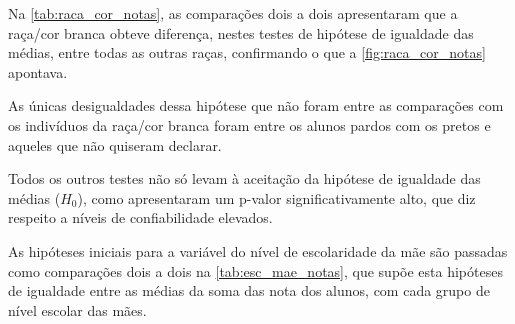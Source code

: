 Na \autoref{tab:raca_cor_notas}, as comparações dois a dois apresentaram que a raça/cor branca obteve diferença,
nestes testes de hipótese de igualdade das médias, entre todas as outras raças, confirmando o que a 
\autoref{fig:raca_cor_notas} apontava.

As únicas desigualdades dessa hipótese que não foram entre as comparações com os indivíduos da raça/cor branca
foram entre os alunos pardos com os pretos e aqueles que não quiseram declarar.

Todos os outros testes não só levam à aceitação da hipótese de igualdade das médias ($H_0$), como apresentaram um p-valor
significativamente alto, que diz respeito a níveis de confiabilidade elevados.


As hipóteses iniciais para a variável do nível de escolaridade da mãe são passadas como comparações dois a dois na \autoref{tab:esc_mae_notas},
que supõe esta hipóteses de igualdade entre as médias da soma das nota dos alunos, com cada grupo de nível escolar das mães.
\newpage

